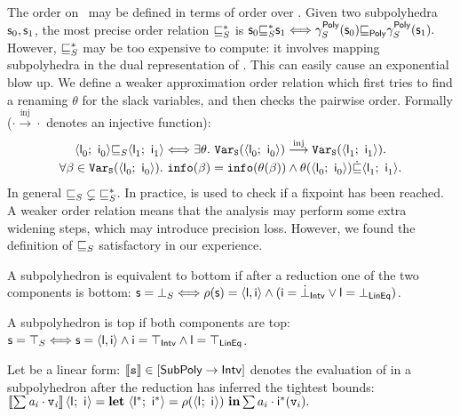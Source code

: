 \documentclass{llncs}
\begin{document}
The order on \Subpoly\ may be defined in terms of order over \Polyhedra.
Given two subpolyhedra $\mathsf{\mathsf{s}}_0, \mathsf{\mathsf{s}}_1$, the most precise order relation ${\sqsubseteq}_{S}^{*}$ is 
\(
\mathsf{\mathsf{s}}_{0} {\sqsubseteq}_{S}^{*} \mathsf{\mathsf{s}}_{1} \Longleftrightarrow  \gamma^{\mathsf{Poly}}_{S}(\mathsf{\mathsf{s}}_{0})  {\sqsubseteq}_{\mathsf{Poly}} \gamma^{\mathsf{Poly}}_{S}(\mathsf{\mathsf{s}}_{1}).
\)
However,  ${\sqsubseteq}_{S}^{*}$ may be too expensive to compute: it involves mapping subpolyhedra in the dual representation of \Polyhedra.
 This can easily cause an exponential blow up.
We define a weaker approximation order relation which first tries to find a renaming $\theta$ for the slack variables, and then checks  the pairwise order.
Formally ($\cdot \stackrel{\mathrm{inj}}{\longrightarrow} \cdot$
denotes an injective function):  
\begin{multline*}
\langle \mathsf{\mathsf{l}}_{0}^{};\ \mathsf{\mathsf{i}}_{0}^{} \rangle {\ensuremath{\sqsubseteq}}_{S} \langle \mathsf{\mathsf{l}}_{1}^{};\ \mathsf{\mathsf{i}}_{1}^{} \rangle \Longleftrightarrow \exists \theta.~ \mathtt{Var}_\mathtt{S}(\langle \mathsf{\mathsf{l}}_{0}^{};\ \mathsf{\mathsf{i}}_{0}^{} \rangle) \stackrel{\mathrm{inj}}{\longrightarrow}  \mathtt{Var}_\mathtt{S}(\langle \mathsf{\mathsf{l}}_{1}^{};\ \mathsf{\mathsf{i}}_{1}^{} \rangle). \\
\forall \beta_{}  \in \mathtt{Var}_\mathtt{S}(\langle \mathsf{\mathsf{l}}_{0}^{};\ \mathsf{\mathsf{i}}_{0}^{} \rangle).\  \mathtt{info}(\beta_{}) =  \mathtt{info}(\theta(\beta_{}))\wedge \theta(\langle \mathsf{\mathsf{l}}_{0}^{};\ \mathsf{\mathsf{i}}_{0}^{} \rangle) \dot{{\sqsubseteq}} \langle \mathsf{\mathsf{l}}_{1}^{};\ \mathsf{\mathsf{i}}_{1}^{} \rangle.
\end{multline*}
In general ${\sqsubseteq}_{S} \subsetneq {\ensuremath{\sqsubseteq}}_{S}^{*}$.
In practice, \lessS{} is used to check if a fixpoint has been reached. 
A weaker order relation means that the analysis may perform some extra widening steps, which may introduce  precision loss.
However, we found the definition of ${\sqsubseteq}_{S}$ satisfactory in our experience.



A subpolyhedron is equivalent to  bottom if after a reduction one of the two components is bottom:
$\mathsf{\mathsf{s}} = \bot_{S} \Longleftrightarrow \rho(\mathsf{\mathsf{s}}) = \langle \mathsf{\mathsf{l}}, \mathsf{\mathsf{i}} \rangle \wedge (\mathsf{\mathsf{i}} = \dot\bot_{\mathsf{Intv}} \vee \mathsf{\mathsf{l}} = \bot_{\mathsf{LinEq}}) $.
 
A subpolyhedron is top if both components are top:
$\mathsf{\mathsf{s}} = \top_{S} \Longleftrightarrow \mathsf{\mathsf{s}} = \langle \mathsf{\mathsf{l}}, \mathsf{\mathsf{i}} \rangle \wedge \mathsf{\mathsf{i}} = \top_{\mathsf{Intv}} \wedge \mathsf{\mathsf{l}} = \top_{\mathsf{LinEq}}$.

Let  be a linear form: $\llbracket \mathtt{s} \rrbracket\in [\mathsf{SubPoly} \rightarrow\mathsf{Intv}]$ denotes the evaluation of  in a subpolyhedron after the reduction has inferred the tightest bounds: 
\(
\left\sx\sum \mathit{a_i} \cdot \var_\mathit{i} \right\dx\subpolyPair{}{} = \mathbf{let}\ \subpolyPair{}{*} = \rho(\subpolyPair{}{})\ \mathbf{in} \sum a_i \cdot \ael{i}^*(\var_i). 
\)
\end{document}
